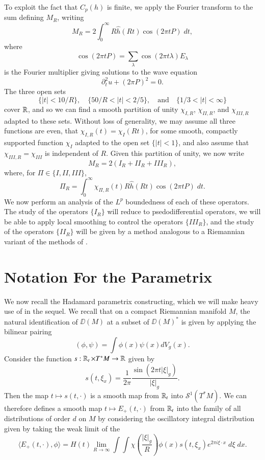 To exploit the fact that $C_p(h)$ is finite, we apply the Fourier transform to the sum defining $M_R$, writing
%
\[ M_R = 2 \int_0^\infty R \widehat{h}(Rt) \cos(2 \pi t P)\; dt, \]
%
where
%
\[ \cos(2 \pi t P) = \sum_\lambda \cos(2 \pi t \lambda) E_\lambda \]
%
is the Fourier multiplier giving solutions to the wave equation
%
\[ \partial_t^2 u + (2 \pi P)^2 = 0. \]
%
The three open sets
%
\[ \{ |t| < 10/R \}, \quad \{ 50/R < |t| < 2/5 \}, \quad\text{and}\quad \{ 1/3 < |t| < \infty \} \]
%
cover $\operatorname{\mathbb{R}}$, and so we can find a smooth partition of unity $\chi_{I,R}$, $\chi_{II,R}$, and $\chi_{III,R}$ adapted to these sets. Without loss of generality, we may assume all three functions are even, that $\chi_{I,R}(t) = \chi_I(Rt)$, for some smooth, compactly supported function $\chi_I$ adapted to the open set $\{ |t| < 1 \}$, and also assume that $\chi_{III,R} = \chi_{III}$ is independent of $R$. Given this partition of unity, we now write
%
\[ M_R = 2(I_R + II_R + III_R), \]
%
where, for $\Pi \in \{ I, II, III \}$,
%
\[ \Pi_R = \int_0^\infty \chi_{\Pi,R}(t) R \widehat{h}(Rt) \cos(2 \pi t P)\; dt. \]
%
We now perform an analysis of the $L^p$ boundedness of each of these operators. The study of the operators $\{ I_R \}$ will reduce to psedodifferential operators, we will be able to apply local smoothing to control the operators $\{ III_R \}$, and the study of the operators $\{ II_R \}$ will be given by a method analogous to a Riemannian variant of the methods of \cite{HeoandNazarovandSeeger}.

\section{Notation For the Parametrix}

We now recall the Hadamard parametrix constructing, which we will make heavy use of in the sequel. We recall that on a compact Riemannian manifold $M$, the natural identification of $\DD(M)$ at a subset of $\DD(M)^*$ is given by applying the bilinear pairing
%
\[ (\phi, \psi) = \int \phi(x) \psi(x) dV_g(x). \]
%
Consider the function $s: \operatorname{\mathbb{R}}_t \times T^* M \to \operatorname{\mathbb{R}}$ given by
%
\[ s(t,\xi_x) = \frac{1}{2\pi} \frac{\sin(2 \pi t |\xi|_g)}{|\xi|_g}. \]
%
Then the map $t \mapsto s(t,\cdot)$ is a smooth map from $\operatorname{\mathbb{R}}_t$ into $\mathcal{S}^1(T^* M)$. We can therefore defines a smooth map $t \mapsto E_+(t,\cdot)$ from $\operatorname{\mathbb{R}}_t$ into the family of all distributions of order $d$ on $M$ by considering the oscillatory integral distribution given by taking the weak limit of the
%
\[ \langle E_+(t,\cdot), \phi \rangle = H(t) \lim_{R \to \infty} \int \int \chi \left( \frac{|\xi|_g}{R} \right) \phi(x)  s(t,\xi_x) e^{2 \pi i \xi \cdot x}\; d\xi\; dx. \]


